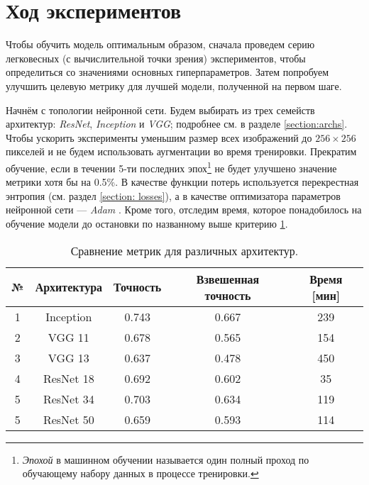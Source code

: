 \section{Ход экспериментов}

\indent
\indent
Чтобы обучить модель оптимальным образом, сначала проведем серию
легковесных (с вычислительной точки зрения) экспериментов, чтобы определиться 
со значениями основных гиперпараметров. Затем попробуем улучшить целевую метрику
для лучшей модели, полученной на первом шаге.

\indent
\indent
Начнём с топологии нейронной сети. Будем выбирать из трех семейств архитектур:
 \textit{ResNet}, \textit{Inception} и \textit{VGG}; подробнее см. в разделе \ref{section:archs}.
Чтобы ускорить эксперименты уменьшим размер всех изображений до
$256 \times 256$ пикселей и не будем использовать аугментации во время тренировки.
Прекратим обучение, если в течении 5-ти последних 
эпох\footnote{\textit{Эпохой} в машинном обучении называется один полный проход по
обучающему набору данных в процессе тренировки.} 
не будет улучшено 
значение метрики хотя бы на 0.5\%. В качестве функции потерь используется перекрестная
энтропия (см. раздел \ref{section: losses}), а в качестве оптимизатора параметров 
нейронной сети --- \textit{Adam} \cite{adam}. Кроме того, отследим время, которое 
понадобилось на обучение модели до остановки по названному выше критерию 
\ref{tabular: arch_compare}.


\begin{table}[h]
    \begin{center}
        \begin{tabular}{c | c| c | c | c}
            \hline
            № & Архитектура & Точность & Взвешенная точность  & Время [мин] \\
            \hline
    
            1 & Inception & 0.743 & 0.667 & 239 \\
            
            2 & VGG 11 & 0.678 & 0.565 & 154 \\
            
            3 & VGG 13 & 0.637 & 0.478 & 450 \\
            
            4 & ResNet 18 & 0.692 & 0.602 & 35 \\
            
            5 & ResNet 34 & 0.703 & 0.634 & 119 \\
            
            5 & ResNet 50 & 0.659 & 0.593 & 114 \\
    
            \hline
        \end{tabular}
    \end{center}
    \caption{Сравнение метрик для различных архитектур.}
    \label{tabular: arch_compare}
\end{table}



